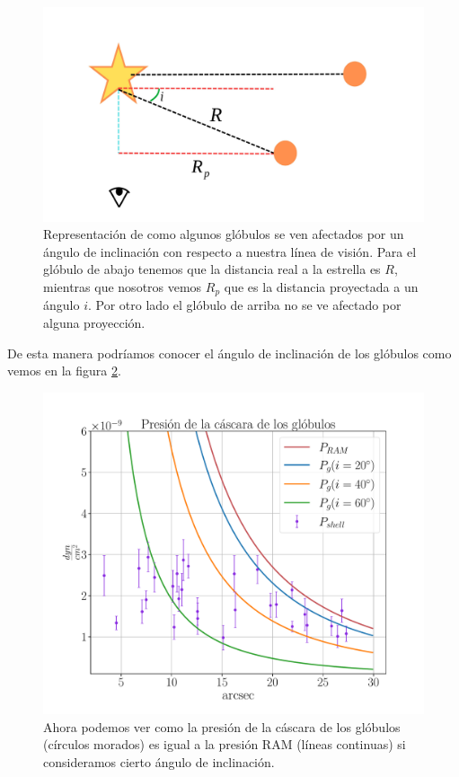 \documentclass{book}
\begin{document}
\begin{figure}[htb]
    \centering
    \includegraphics[width=\textwidth]{artesanales/ImgFi01-6.pdf}
    \caption{Representación de como algunos glóbulos se ven afectados por un ángulo de inclinación con respecto a nuestra línea de visión. Para el glóbulo de abajo tenemos que la distancia real a la estrella es $R$, mientras que nosotros vemos $R_p$ que es la distancia proyectada a un ángulo $i$. Por otro lado el glóbulo de arriba no se ve afectado por alguna proyección.}
    \label{Ang proyeccion}
\end{figure}

De esta manera podríamos conocer el ángulo de inclinación de los glóbulos como vemos en la figura \ref{graf_presion_ang}.

\begin{figure}[htb]
    \centering
    \includegraphics[width=\textwidth]{Nuevas imagenes finales/R_1.pdf}
    \caption{Ahora podemos ver como la presión de la cáscara de los glóbulos (círculos morados) es igual a la presión RAM (líneas continuas) si consideramos cierto ángulo de inclinación.}
    \label{graf_presion_ang}
\end{figure}
\end{document}
